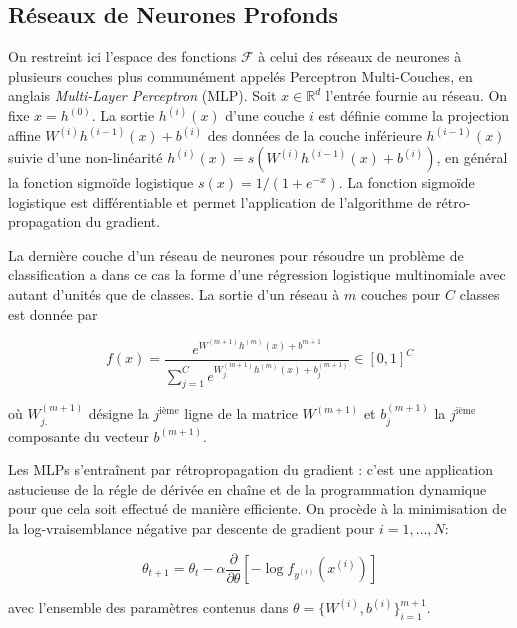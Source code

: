 \subsection{Réseaux de Neurones Profonds}

On restreint ici l'espace des fonctions $\mathcal{F}$ à celui des réseaux de
neurones à plusieurs couches plus communément appelés Perceptron Multi-Couches,
en anglais \textit{Multi-Layer Perceptron} (MLP)\citep{Rumelhart86}. Soit
$x\in\mathbb{R}^d$ l'entrée fournie au réseau. On fixe $x=h^{(0)}$. La sortie
$h^{(i)}(x)$ d'une couche $i$ est définie comme la projection affine
$W^{(i)}h^{(i-1)}(x) + b^{(i)}$ des données de la couche inférieure $h^{(i-1)}(x)$
suivie d'une non-linéarité $h^{(i)}(x)= s(W^{(i)}h^{(i-1)}(x) + b^{(i)})$, en
général la fonction sigmoïde logistique $s(x)=1/(1+e^{-x})$. La fonction sigmoïde logistique est différentiable et
permet l'application de l'algorithme de rétro-propagation du gradient. 

La dernière couche d'un réseau de neurones pour résoudre un problème de
classification a dans ce cas la forme d'une régression logistique multinomiale
avec autant d'unités que de classes. La sortie d'un réseau à $m$ couches pour
$C$ classes est donnée par

\begin{equation}
\label{eq:softmax}
f(x) = \frac{e^{W^{(m+1)} h^{(m)}(x) + b^{m+1}}}{\sum_{j=1}^C e^{W^{(m+1)}_{j.} h^{(m)}(x) + b^{(m+1)}_{j} }} \in [0,1]^{C}
\end{equation}

où $W_{j.}^{(m+1)}$ désigne la $j^\textrm{ième}$ ligne de la matrice $W^{(m+1)}$
et $b_{j}^{(m+1)}$ la $j^\textrm{ième}$ composante du vecteur $b^{(m+1)}$.

Les MLPs s'entraînent par rétropropagation du gradient \citep{Rumelhart86b}:
c'est une application astucieuse de la régle de dérivée en chaîne et de la
programmation dynamique pour que cela soit effectué de manière efficiente. On
procède à la minimisation de la log-vraisemblance négative par descente de
gradient pour $i=1,\dots,N$:

\begin{equation}
\theta_{t+1} = \theta_{t} - \alpha \dfrac{\partial}{\partial\theta} [-\log f_{y^{(i)}}(x^{(i)})]
\end{equation}

avec l'ensemble des paramètres contenus dans $\theta=\lbrace W^{(i)},b^{(i)}\rbrace_{i=1}^{m+1}$.




